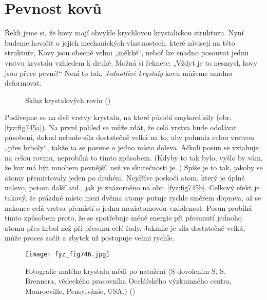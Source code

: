   \section{Pevnost kovů}\label{fyz:IIchapXXXsecVII}
    Řekli jsme si, že kovy mají obvykle krychlovou krystalickou strukturu. Nyní budeme hovořit o 
    jejich mechanických vlastnostech, které závisejí na této struktuře, Kovy jsou obecně velmi 
    „měkké“, neboť lze snadno posouvat jednu vrstvu krystalu vzhledem k druhé. Možná si řeknete: 
    „Vždyť je to nesmysl, kovy jsou přece pevné!“ Není to tak. \emph{Jednotlivé krystaly} kovu 
    můžeme snadno deformovat.
    
    \begin{figure}[ht!]    %
      \centering
                     \newline
      \caption{Skluz krystalových rovin (\cite[s.~552]{Feynman02})}
      \label{fyz:fig745}
    \end{figure}
    
    Podívejme se na dvě vrstvy krystalu, na které působí smyková síly (obr. \ref{fyz:fig745a}). Na 
    první pohled se může zdát, že celá vrstva bude odolávat působení, dokud nebude síla dostatečně 
    velká na to, aby pohnula celou vrstvou „přes hrboly“, takže ta se posune o jedno místo doleva. 
    Ačkoli posun se vztahuje na celou rovinu, neprobíhá to tímto způsobem. (Kdyby to tak bylo, 
    vyšlo by vám, že kov má být mnohem pevnější, než ve skutečnosti je..) Spíše je to tak, jakoby 
    se atomy přemisťovaly jeden po druhém. Nejdříve poskočí atom, který je úplně nalevo, potom 
    další atd., jak je znázorněno na obr. \ref{fyz:fig745b}. Celkový efekt je takový, že prázdné 
    místo mezi dvěma atomy putuje rychle směrem doprava, až se nakonec celá vrstva přemístí o jednu 
    meziatomovou vzdálenost. Posun probíhá tímto způsobem proto, že se spotřebuje méně energie při 
    přesunutí jednoho atomu přes hrbol než při přesunu celé řady. Jakmile je síla dostatečně velká, 
    může proces začít a zbytek už postupuje velmi rychle.
    
    
    \begin{figure}[ht!] %
      \centering
      \texttt{[image: fyz\_fig746.jpg]}
      \caption{Fotografie malého krystalu mědi po natažení (S dovolením S. S. Brennera, vědeckého 
               pracovníka Ocelářského výzkumného centra, Monroeville, Pensylvánie, USA.)
               (\cite[s.~552]{Feynman02})}
      \label{fyz:fig746}
    \end{figure}
    
